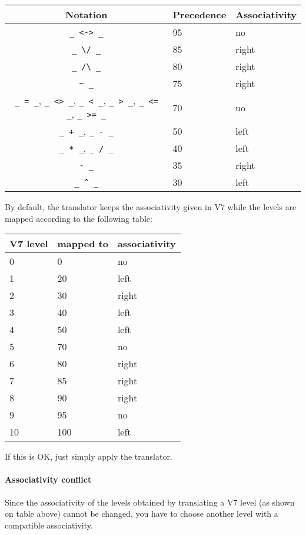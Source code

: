 \documentclass[11pt,a4paper]{article}
\begin{document}
\begin{center}
\begin{tabular}{|cll|}
\hline
Notation & Precedence & Associativity \\
\hline
\verb!_ <-> _! & 95 & no \\
\verb!_ \/ _!  & 85 & right \\
\verb!_ /\ _!  & 80 & right \\
\verb!~ _!   & 75 & right \\
\verb!_ = _!, \verb!_ <> _!, \verb!_ < _!, \verb!_ > _!,
  \verb!_ <= _!, \verb!_ >= _!   & 70 & no \\
\verb!_ + _!, \verb!_ - _!   & 50 & left \\
\verb!_ * _!, \verb!_ / _!   & 40 & left \\
\verb!- _!  & 35 & right \\
\verb!_ ^ _!   & 30 & left \\
\hline
\end{tabular}
\end{center}


  By default, the translator keeps the associativity given in V7 while
the levels are mapped according to the following table:
 
\begin{center}
\begin{tabular}{l|l|l}
V7 level & mapped to & associativity \\
\hline
0 & 0 & no \\
1 & 20 & left \\
2 & 30 & right \\
3 & 40 & left \\
4 & 50 & left \\
5 & 70 & no \\
6 & 80 & right \\
7 & 85 & right \\
8 & 90 & right \\
9 & 95 & no \\
10 & 100 & left
\end{tabular}
\end{center}

If this is OK, just simply apply the translator.


\paragraph{Associativity conflict}

  Since the associativity of the levels obtained by translating a V7
level (as shown on table above) cannot be changed, you have to choose
another level with a compatible associativity.
\end{document}
